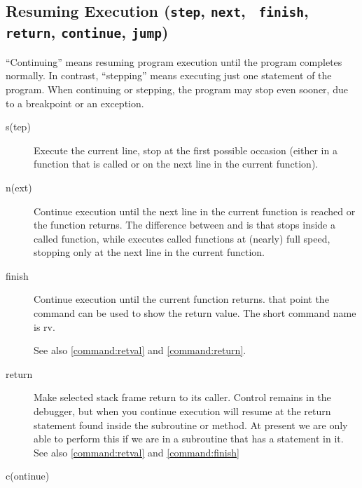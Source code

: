 \subsection{Resuming Execution ({\tt step}, {\tt next}, {\tt
    finish}, {\tt return}, {\tt continue}, {\tt jump})\label{subsubsection-resume}}

``Continuing'' means resuming program execution until the program
completes normally.  In contrast, ``stepping'' means executing just
one statement of the program. When continuing or stepping, the program may stop even sooner, due to a breakpoint or an
exception.

\begin{description}

\item[s(tep) ]\label{command:step}

Execute the current line, stop at the first possible occasion
(either in a function that is called or on the next line in the
current function).

\item[n(ext) ]\label{command:next}

Continue execution until the next line in the current function
is reached or the function returns.  The difference between  and
 is that  stops inside a called function, while
 executes called functions at (nearly) full speed, 
stopping only at the next line in the current function.

\item[finish]\label{command:finish}

Continue execution until the current function returns.
that point the  command can be used to show the
return value. The short command name is rv.

See also \ref{command:retval} and \ref{command:return}.

\item[return]\label{command:return}

Make selected stack frame return to its caller. Control remains in the
debugger, but when you continue execution will resume at the return
statement found inside the subroutine or method.  At present we are
only able to perform this if we are in a subroutine that has a
 statement in it.  See also \ref{command:retval} and
\ref{command:finish}

\item[c(ontinue)]


\end{description}
